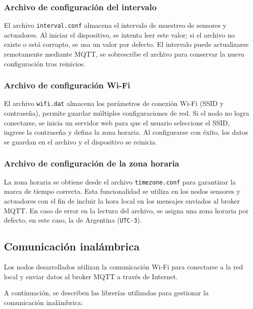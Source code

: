 \subsubsection{Archivo de configuración del intervalo}

El archivo \texttt{interval.conf} almacena el intervalo de muestreo de sensores
y actuadores. Al iniciar el dispositivo, se intenta leer este valor; si el
archivo no existe o está corrupto, se usa un valor por defecto. El intervalo
puede actualizarse remotamente mediante MQTT, se sobrescribe el archivo para
conservar la nueva configuración tras reinicios.

\subsubsection{Archivo de configuración Wi-Fi}

El archivo \texttt{wifi.dat} almacena los parámetros de conexión Wi-Fi (SSID y
contraseña), permite guardar múltiples configuraciones de red. Si el nodo no
logra conectarse, se inicia un servidor web para que el usuario seleccione el
SSID, ingrese la contraseña y defina la zona horaria. Al configurarse con
éxito, los datos se guardan en el archivo y el dispositivo se reinicia.

\subsubsection{Archivo de configuración de la zona horaria}

La zona horaria se obtiene desde el archivo \texttt{timezone.conf} para
garantizar la marca de tiempo correcta. Esta funcionalidad se utiliza en los
nodos sensores y actuadores con el fin de incluir la hora local en los mensajes
enviados al broker MQTT. En caso de error en la lectura del archivo, se asigna
una zona horaria por defecto, en este caso, la de Argentina (\texttt{UTC-3}).


\subsection{Comunicación inalámbrica}

Los nodos desarrollados utilizan la comunicación Wi-Fi para conectarse a la red
local y enviar datos al broker MQTT a través de Internet.

A continuación, se describen las librerías utilizadas para gestionar la
comunicación inalámbrica:

